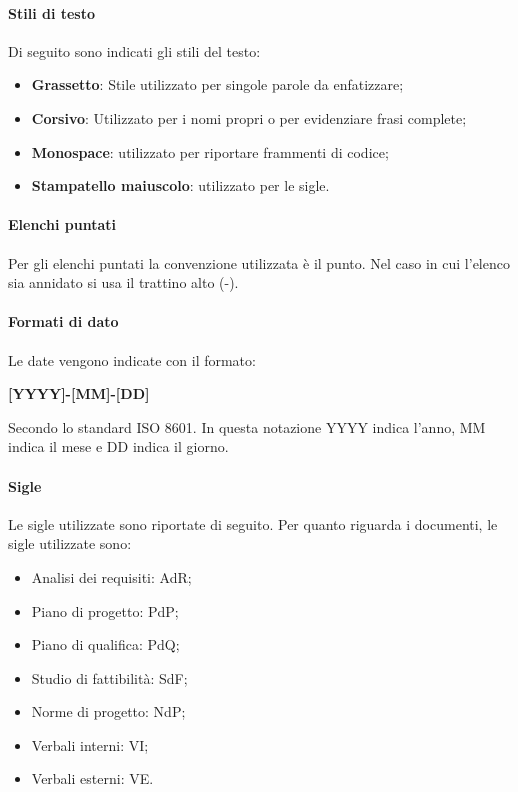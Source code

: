 \documentclass[../norme_di_progetto.tex]{subfiles}
\begin{document}
\paragraph{Stili di testo}
Di seguito sono indicati gli stili del testo:
\begin{itemize}
    \item \textbf{Grassetto}: Stile utilizzato per singole parole da enfatizzare;
    \item \textbf{Corsivo}: Utilizzato per i nomi propri o per evidenziare frasi complete;
    \item \textbf{Monospace}: utilizzato per riportare frammenti di codice;
    \item \textbf{Stampatello maiuscolo}: utilizzato per le sigle.
\end{itemize}

\paragraph{Elenchi puntati}
Per gli elenchi puntati la convenzione utilizzata è il punto. Nel caso in cui l'elenco sia annidato si usa il trattino alto (-).

\paragraph{Formati di dato}
Le date vengono indicate con il formato:
\begin{center}
    \textbf{[YYYY]-[MM]-[DD]}
\end{center}
Secondo lo standard ISO 8601. In questa notazione YYYY indica l'anno, MM indica il mese e DD indica il giorno.

\paragraph{Sigle}
Le sigle utilizzate sono riportate di seguito.
Per quanto riguarda i documenti, le sigle utilizzate sono:
\begin{itemize}
    \item Analisi dei requisiti: AdR;
    \item Piano di progetto: PdP;
    \item Piano di qualifica: PdQ;
    \item Studio di fattibilità: SdF;
    \item Norme di progetto: NdP;
    \item Verbali interni: VI;
    \item Verbali esterni: VE.
\end{itemize}
\end{document}
